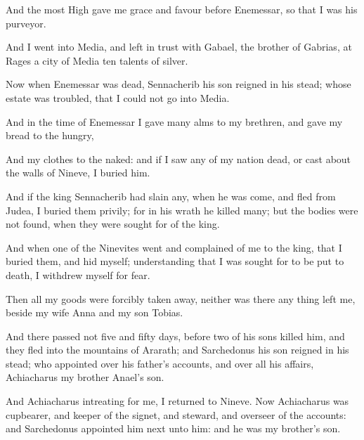 {\par }{\PP {}And the most High gave me grace and favour before Enemessar, so that I was his purveyor.
\par }{\PP {}And I went into Media, and left in trust with Gabael, the brother of Gabrias, at Rages a city of Media ten talents of silver.
\par }{\PP {}Now when Enemessar was dead, Sennacherib his son reigned in his stead; whose estate was troubled, that I could not go into Media.
\par }{\PP {}And in the time of Enemessar I gave many alms to my brethren, and gave my bread to the hungry,
\par }{\PP {}And my clothes to the naked: and if I saw any of my nation dead, or cast about the walls of Nineve, I buried him.
\par }{\PP {}And if the king Sennacherib had slain any, when he was come, and fled from Judea, I buried them privily; for in his wrath he killed many; but the bodies were not found, when they were sought for of the king.
\par }{\PP {}And when one of the Ninevites went and complained of me to the king, that I buried them, and hid myself; understanding that I was sought for to be put to death, I withdrew myself for fear.
\par }{\PP {}Then all my goods were forcibly taken away, neither was there any thing left me, beside my wife Anna and my son Tobias.
\par }{\PP {}And there passed not five and fifty days, before two of his sons killed him, and they fled into the mountains of Ararath; and Sarchedonus his son reigned in his stead; who appointed over his father’s accounts, and over all his affairs, Achiacharus my brother Anael’s son.
\par }{\PP {}And Achiacharus intreating for me, I returned to Nineve. Now Achiacharus was cupbearer, and keeper of the signet, and steward, and overseer of the accounts: and Sarchedonus appointed him next unto him: and he was my brother’s son.

}
